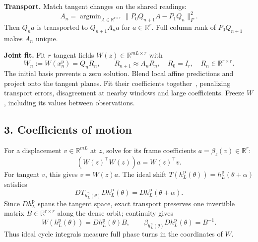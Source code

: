 \documentclass[11pt,a4paper]{article}
\newcommand{\R}{\mathbb R}
\begin{document}
\textbf{Transport.} Match tangent changes on the shared readings:
\[
A_n=\mathop{\arg\min}_{A\in\R^{r\times r}}
\|P_0Q_{n+1}A-P_1Q_n\|_F^2.
\]
Then $Q_na$ is transported to $Q_{n+1}A_na$ for $a\in\R^r$.
Full column rank of $P_0Q_{n+1}$ makes $A_n$ unique.

\textbf{Joint fit.} Fit $r$ tangent fields $W(z)\in\R^{mL\times r}$ with
\[
W_n:=W(x_n^{\mathrm p})=Q_nR_n,\qquad
R_{n+1}\approx A_nR_n,\quad R_0=I_r,\quad R_n\in\R^{r\times r}.
\]
The initial basis prevents a zero solution.
Blend local affine predictions and project onto the tangent planes.
Fit their coefficients together~\citep{Thunberg2015}, penalizing transport
errors, disagreement at nearby windows and large coefficients.
Freeze $W$, including its values between observations.

\subsection*{3. Coefficients of motion}
For a displacement $v\in\R^{mL}$ at $z$, solve for its frame coefficients
$a=\beta_z(v)\in\R^r$:
\[
(W(z)^\top W(z))a=W(z)^\top v.
\]
For tangent $v$, this gives $v=W(z)a$.
The ideal shift
$T(h_L^{\mathrm p}(\theta))=h_L^{\mathrm p}(\theta+\alpha)$ satisfies
\[
DT_{h_L^{\mathrm p}(\theta)}Dh_L^{\mathrm p}(\theta)
=Dh_L^{\mathrm p}(\theta+\alpha).
\]
Since $Dh_L^{\mathrm p}$ spans the tangent space, exact transport preserves
one invertible matrix $B\in\R^{r\times r}$ along the dense orbit;
continuity gives
\[
W(h_L^{\mathrm p}(\theta))=Dh_L^{\mathrm p}(\theta)B,
\qquad \beta_{h_L^{\mathrm p}(\theta)}Dh_L^{\mathrm p}(\theta)=B^{-1}.
\]
Thus ideal cycle integrals measure full phase turns in the coordinates of $W$.
\end{document}
